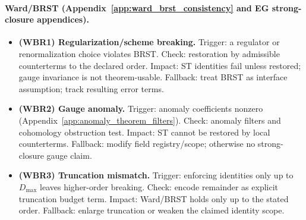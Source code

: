 \paragraph{Ward/BRST (Appendix~\ref{app:ward_brst_consistency} and EG strong-closure appendices).}
\begin{itemize}
\item \textbf{(WBR1) Regularization/scheme breaking.}
  Trigger: a regulator or renormalization choice violates BRST.
  Check: restoration by admissible counterterms to the declared order.
  Impact: ST identities fail unless restored; gauge invariance is not theorem-usable.
  Fallback: treat BRST as interface assumption; track resulting error terms.
\item \textbf{(WBR2) Gauge anomaly.}
  Trigger: anomaly coefficients nonzero (Appendix~\ref{app:anomaly_theorem_filters}).
  Check: anomaly filters and cohomology obstruction test.
  Impact: ST cannot be restored by local counterterms.
  Fallback: modify field registry/scope; otherwise no strong-closure gauge claim.
\item \textbf{(WBR3) Truncation mismatch.}
  Trigger: enforcing identities only up to $D_{\max}$ leaves higher-order breaking.
  Check: encode remainder as explicit truncation budget term.
  Impact: Ward/BRST holds only up to the stated order.
  Fallback: enlarge truncation or weaken the claimed identity scope.
\end{itemize}

